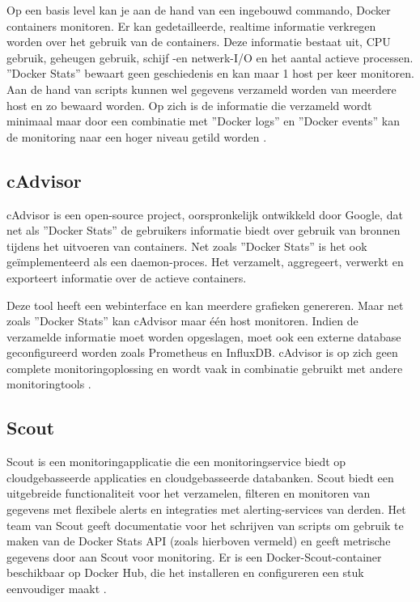 Op een basis level kan je aan de hand van een ingebouwd commando, Docker containers monitoren. Er kan gedetailleerde, realtime informatie verkregen worden over het gebruik van de containers. Deze informatie bestaat uit, CPU gebruik, geheugen gebruik, schijf -en netwerk-I/O en het aantal actieve processen. ''Docker Stats'' bewaart geen geschiedenis en kan maar 1 host per keer monitoren. Aan de hand van scripts kunnen wel gegevens verzameld worden van meerdere host en zo bewaard worden. Op zich is de informatie die verzameld wordt minimaal maar door een combinatie met ''Docker logs'' en ''Docker events''  kan de monitoring naar een hoger niveau getild worden \autocite{Sissons2021}.  

\subsection{cAdvisor}

cAdvisor is een open-source project, oorspronkelijk ontwikkeld door Google, dat net als ''Docker Stats'' de gebruikers informatie biedt over gebruik van bronnen tijdens het uitvoeren van containers. Net zoals ''Docker Stats'' is het ook geïmplementeerd als een daemon-proces. Het verzamelt, aggregeert, verwerkt en exporteert informatie over de actieve containers.

Deze tool heeft een webinterface en kan meerdere grafieken genereren. Maar net zoals ''Docker Stats'' kan cAdvisor maar één host monitoren. Indien de verzamelde informatie moet worden opgeslagen, moet ook een externe database geconfigureerd worden zoals Prometheus en InfluxDB. cAdvisor is op zich geen complete monitoringoplossing en wordt vaak in combinatie gebruikt met andere monitoringtools \autocite{Sissons2021}.

\subsection{Scout}

Scout is een monitoringapplicatie die een monitoringservice biedt op cloudgebasseerde applicaties en cloudgebasseerde databanken. Scout biedt een uitgebreide functionaliteit voor het verzamelen, filteren en monitoren van gegevens met flexibele alerts en integraties met alerting-services van derden. Het team van Scout geeft documentatie voor het schrijven van scripts om gebruik te maken van de Docker Stats API (zoals hierboven vermeld) en geeft metrische gegevens door aan Scout voor monitoring. Er is een Docker-Scout-container beschikbaar op Docker Hub, die het installeren en configureren een stuk eenvoudiger maakt \autocite{Sissons2021}.

